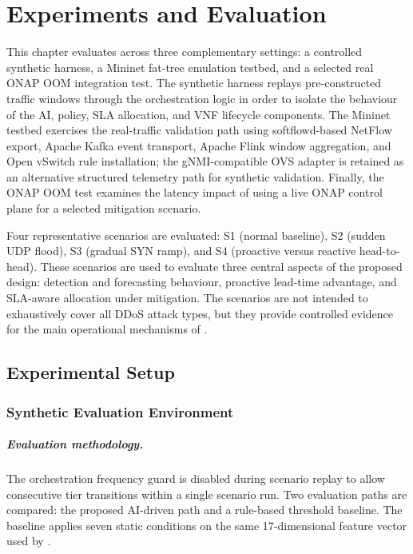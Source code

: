 ﻿\chapter{Experiments and Evaluation}
\label{ch:eval}

This chapter evaluates \padonap{} across three complementary settings:
a controlled synthetic harness, a Mininet fat-tree emulation testbed, and
a selected real ONAP OOM integration test. The synthetic harness replays
pre-constructed traffic windows through the orchestration logic in order to
isolate the behaviour of the AI, policy, SLA allocation, and VNF lifecycle
components. The Mininet testbed exercises the real-traffic validation path
using softflowd-based NetFlow export, Apache Kafka event transport, Apache
Flink window aggregation, and Open vSwitch rule installation; the
gNMI-compatible OVS adapter is retained as an alternative structured telemetry
path for synthetic validation. Finally, the ONAP OOM test examines the latency
impact of using a live ONAP control plane for a selected mitigation scenario.

Four representative scenarios are evaluated: S1 (normal baseline), S2
(sudden UDP flood), S3 (gradual SYN ramp), and S4 (proactive versus reactive
head-to-head). These scenarios are used to evaluate three central aspects of
the proposed design: detection and forecasting behaviour, proactive lead-time
advantage, and SLA-aware allocation under mitigation. The scenarios are not
intended to exhaustively cover all DDoS attack types, but they provide
controlled evidence for the main operational mechanisms of \padonap{}.

\section{Experimental Setup}
\label{sec:implementation}

\subsection{Synthetic Evaluation Environment}

\paragraph{Evaluation methodology.}
The orchestration frequency guard is disabled during scenario replay to allow
consecutive tier transitions within a single scenario run. Two evaluation
paths are compared: the proposed AI-driven path and a rule-based threshold
baseline. The baseline applies seven static conditions on the same
17-dimensional feature vector used by \padonap{}.

